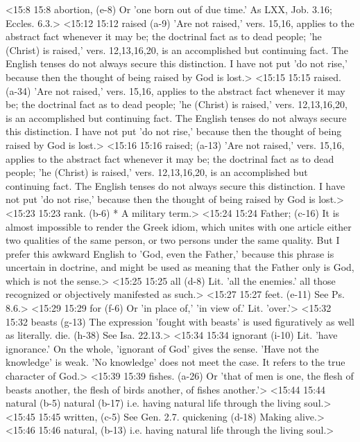 <15:8 15:8  abortion, (e-8)  Or 'one born out of due time.' As LXX, Job. 3.16; Eccles. 6.3.>
<15:12 15:12  raised (a-9)  'Are not raised,' vers. 15,16, applies to the abstract fact  whenever it may be; the doctrinal fact as to dead people; 'he  (Christ) is raised,' vers. 12,13,16,20, is an accomplished but  continuing fact. The English tenses do not always secure this  distinction. I have not put 'do not rise,' because then the  thought of being raised by God is lost.>
<15:15 15:15  raised. (a-34)  'Are not raised,' vers. 15,16, applies to the abstract fact  whenever it may be; the doctrinal fact as to dead people; 'he  (Christ) is raised,' vers. 12,13,16,20, is an accomplished but  continuing fact. The English tenses do not always secure this  distinction. I have not put 'do not rise,' because then the  thought of being raised by God is lost.>
<15:16 15:16  raised; (a-13)  'Are not raised,' vers. 15,16, applies to the abstract fact  whenever it may be; the doctrinal fact as to dead people; 'he  (Christ) is raised,' vers. 12,13,16,20, is an accomplished but  continuing fact. The English tenses do not always secure this  distinction. I have not put 'do not rise,' because then the  thought of being raised by God is lost.>
<15:23 15:23  rank. (b-6)  * A military term.>
<15:24 15:24  Father; (c-16)  It is almost impossible to render the Greek idiom, which  unites with one article either two qualities of the same  person, or two persons under the same quality. But I prefer  this awkward English to 'God, even the Father,' because this  phrase is uncertain in doctrine, and might be used as meaning  that the Father only is God, which is not the sense.>
<15:25 15:25  all (d-8)  Lit. 'all the enemies.' all those recognized or objectively  manifested as such.>
<15:27 15:27  feet. (e-11)  See Ps. 8.6.>
<15:29 15:29  for (f-6)  Or 'in place of,' 'in view of.' Lit. 'over.'>
<15:32 15:32  beasts (g-13)  The expression 'fought with beasts' is used figuratively as  well as literally.
  die. (h-38)  See Isa. 22.13.>
<15:34 15:34  ignorant (i-10)  Lit. 'have ignorance.' On the whole, 'ignorant of God' gives  the sense. 'Have not the knowledge' is weak. 'No knowledge'  does not meet the case. It refers to the true character of God.>
<15:39 15:39  fishes. (a-26)  Or 'that of men is one, the flesh of beasts another, the  flesh of birds another, of fishes another.'>
<15:44 15:44  natural (b-5)  natural (b-17)
 i.e. having natural life through the living soul.>
<15:45 15:45  written, (c-5)  See Gen. 2.7.
  quickening (d-18)  Making alive.>
<15:46 15:46  natural, (b-13)  i.e. having natural life through the living soul.>
